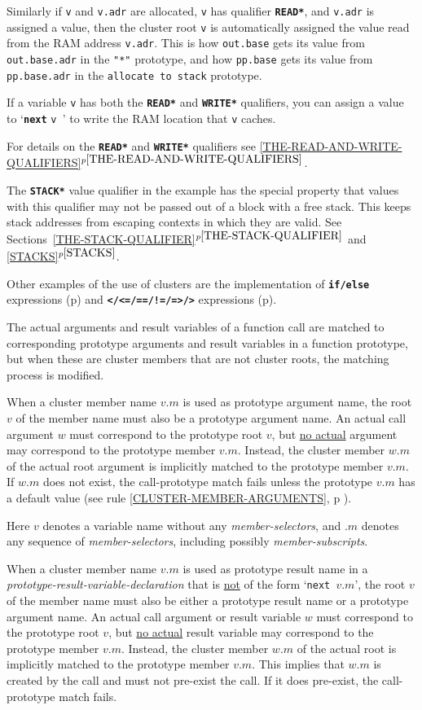 \documentclass[12pt]{article}
\newcommand{\TT}[1]{{\tt \bfseries #1}}
\newcommand{\itemref}[1]{\ref{#1}$^{p\pageref{#1}}$}
\newcommand{\pagref}[1]{p\pageref{#1}}
\begin{document}
Similarly if {\tt v} and {\tt v.adr} are allocated, {\tt v} has qualifier
\TT{*READ*}, and {\tt v.adr} is assigned a value, then
the cluster root {\tt v} is automatically
assigned the value read from the RAM address {\tt v.adr}.
This is how {\tt out.base} gets its value from
{\tt out.base.adr} in the {\tt "*"} prototype, and
how {\tt pp.base} gets its value from
{\tt pp.base.adr} in the {\tt allocate to stack} prototype.

If a variable {\tt v} has both the \TT{*READ*} and \TT{*WRITE*}
qualifiers, you can assign a value to `\TT{next} {\tt v }' to write
the RAM location that {\tt v} caches.

For details on the \TT{*READ*} and \TT{*WRITE*} qualifiers
see \itemref{THE-READ-AND-WRITE-QUALIFIERS}.

The \TT{*STACK*} value qualifier in the example has the special property
that values with
this qualifier may not be passed out of a block with a free
stack.  This keeps stack addresses from escaping contexts in
which they are valid.  See Sections~\itemref{THE-STACK-QUALIFIER} and
\itemref{STACKS}.

Other examples of the use of clusters are the implementation of
\TT{if/else} expressions (\pagref{IF-ELSE-IMPLEMENTATION})
and \TT{</<=/==/!=/=>/>} expressions (\pagref{COMPARE-IMPLEMENTATION}).

The actual arguments and result variables of a function call are
matched to corresponding prototype arguments and result variables in
a function prototype, but when these are cluster members that are
not cluster roots, the matching process is modified.

When a cluster member name $v.m$ is used as prototype argument name,
the root $v$ of the member name must also be a prototype argument name.
An actual call argument $w$ must correspond to the prototype root $v$, but
\underline{no actual} argument may correspond to the prototype member $v.m$.
Instead, the cluster member $w.m$ of the actual root argument is implicitly
matched to the prototype member $v.m$.  If $w.m$ does not exist,
the call-prototype match fails unless the prototype $v.m$ has a
default value (see rule \ref{CLUSTER-MEMBER-ARGUMENTS},
\pagref{CLUSTER-MEMBER-ARGUMENTS} ).

Here $v$ denotes a variable name without any {\em member-selectors},
and $.m$ denotes any sequence of {\em member-selectors}, including possibly
{\em member-subscripts}.

When a cluster member name $v.m$ is used as prototype result name in
a {\em prototype-result-variable-declaration} that is \underline{not}
of the form `{\tt next $v.m$}',
the root $v$ of the member name must also be either a prototype result name
or a prototype argument name.
An actual call argument or result variable
$w$ must correspond to the prototype root $v$, but
\underline{no actual} result variable
may correspond to the prototype member $v.m$.
Instead, the cluster member $w.m$ of the actual root is implicitly
matched to the prototype member $v.m$.  This implies that $w.m$ is
created by the call and must
not pre-exist the call.  If it does pre-exist, the call-prototype match fails.
\end{document}
